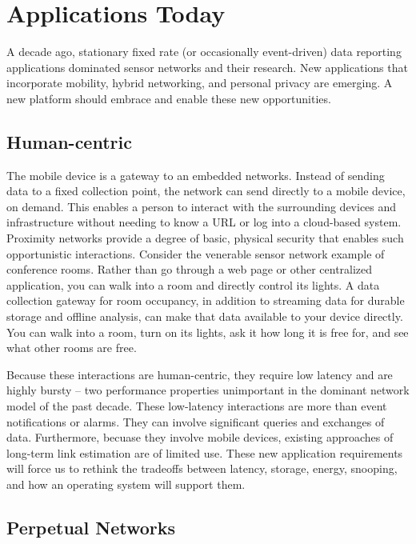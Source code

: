 \section{Applications Today}

A decade ago, stationary fixed rate (or occasionally event-driven) data 
reporting applications dominated sensor networks and their research. 
New applications that incorporate mobility, hybrid networking, and 
personal privacy are emerging. A new platform should embrace and enable 
these new opportunities.

\subsection{Human-centric}

The mobile device is a gateway to an embedded networks. Instead of
sending data to a fixed collection point, the network can send directly
to a mobile device, on demand. This enables a person to interact with
the surrounding devices and infrastructure without needing to know a
URL or log into a cloud-based system. Proximity networks provide a degree
of basic, physical security that enables such opportunistic interactions.
Consider the venerable sensor network example of conference rooms. 
Rather than go through a web page or other centralized application, 
you can walk into a room and directly control its lights. 
A data collection gateway for room occupancy,  in addition to streaming
data for durable storage and offline analysis, can make that data
available to your device directly. You can walk into a room, turn on its 
lights, ask it how long it is free for, and see what other rooms are free.

Because these interactions are human-centric, they require low latency and
are highly bursty -- two performance properties unimportant in the 
dominant network model of the past decade. These low-latency interactions
are more than event notifications or alarms. They can involve significant
queries and exchanges of data. Furthermore, becuase they involve mobile
devices, existing approaches of long-term link estimation are of limited use.
These new application requirements will force us to rethink the tradeoffs
between latency, storage, energy, snooping, and how an operating system will
support them.

\subsection{Perpetual Networks}

